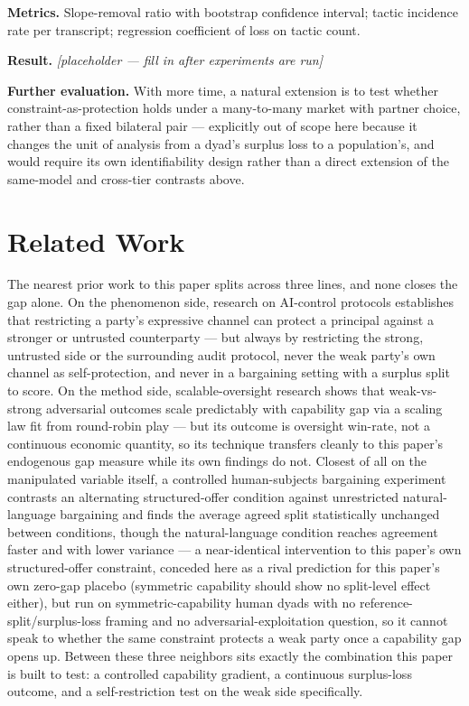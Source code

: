 \documentclass[11pt]{article}
\newcommand{\ph}{\textit{[placeholder --- fill in after experiments are run]}}
\begin{document}
\textbf{Metrics.} Slope-removal ratio with bootstrap confidence interval; tactic incidence rate per transcript; regression coefficient of loss on tactic count.

\textbf{Result.} \ph

\vspace{0.5em}
\noindent\textbf{Further evaluation.} With more time, a natural extension is to test whether constraint-as-protection holds under a many-to-many market with partner choice, rather than a fixed bilateral pair --- explicitly out of scope here because it changes the unit of analysis from a dyad's surplus loss to a population's, and would require its own identifiability design rather than a direct extension of the same-model and cross-tier contrasts above.

\section{Related Work}

The nearest prior work to this paper splits across three lines, and none closes the gap alone. On the phenomenon side, research on AI-control protocols \citep{AIControl} establishes that restricting a party's expressive channel can protect a principal against a stronger or untrusted counterparty --- but always by restricting the strong, untrusted side or the surrounding audit protocol, never the weak party's own channel as self-protection, and never in a bargaining setting with a surplus split to score. On the method side, scalable-oversight research \citep{ScalingLawsOversight} shows that weak-vs-strong adversarial outcomes scale predictably with capability gap via a scaling law fit from round-robin play --- but its outcome is oversight win-rate, not a continuous economic quantity, so its technique transfers cleanly to this paper's endogenous gap measure while its own findings do not. Closest of all on the manipulated variable itself, a controlled human-subjects bargaining experiment \citep{LanguageOfBargaining2023} contrasts an alternating structured-offer condition against unrestricted natural-language bargaining and finds the average agreed split statistically unchanged between conditions, though the natural-language condition reaches agreement faster and with lower variance --- a near-identical intervention to this paper's own structured-offer constraint, conceded here as a rival prediction for this paper's own zero-gap placebo (symmetric capability should show no split-level effect either), but run on symmetric-capability human dyads with no reference-split/surplus-loss framing and no adversarial-exploitation question, so it cannot speak to whether the same constraint protects a weak party once a capability gap opens up. Between these three neighbors sits exactly the combination this paper is built to test: a controlled capability gradient, a continuous surplus-loss outcome, and a self-restriction test on the weak side specifically.
\end{document}
